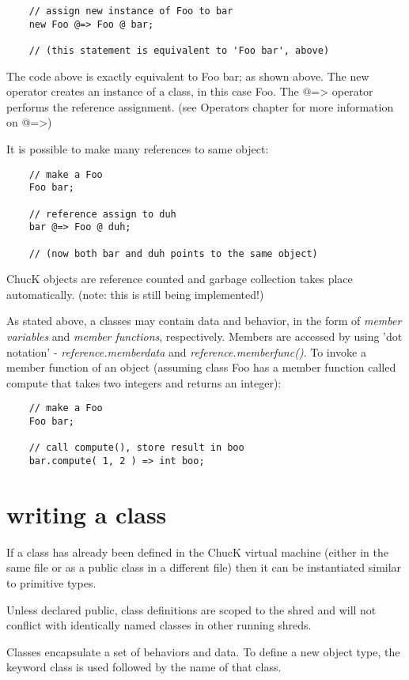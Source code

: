 \begin{verbatim}
    // assign new instance of Foo to bar
    new Foo @=> Foo @ bar;

    // (this statement is equivalent to 'Foo bar', above)
\end{verbatim}

The code above is exactly equivalent to Foo bar; as shown above. The new operator creates an instance of a class, in this case Foo. The @=> operator performs the reference assignment. (see Operators chapter for more information on @=>)

It is possible to make many references to same object:
\begin{verbatim}
    // make a Foo
    Foo bar;

    // reference assign to duh
    bar @=> Foo @ duh;

    // (now both bar and duh points to the same object)
\end{verbatim}
ChucK objects are reference counted and garbage collection takes place automatically. (note: this is still being implemented!)

As stated above, a classes may contain data and behavior, in the form of {\it member variables} and {\it member functions}, respectively. Members are accessed by using 'dot notation' - {\it reference.memberdata} and {\it reference.memberfunc()}. To invoke a member function of an object (assuming class Foo has a member function called compute that takes two integers and returns an integer):
\begin{verbatim}
    // make a Foo
    Foo bar;

    // call compute(), store result in boo
    bar.compute( 1, 2 ) => int boo;
\end{verbatim}

\section{writing a class}

If a class has already been defined in the ChucK virtual machine (either in the same file or as a public class in a different file) then it can be instantiated similar to primitive types.

Unless declared public, class definitions are scoped to the shred and will not conflict with identically named classes in other running shreds.

Classes encapsulate a set of behaviors and data. To define a new object type, the keyword class is used followed by the name of that class.

